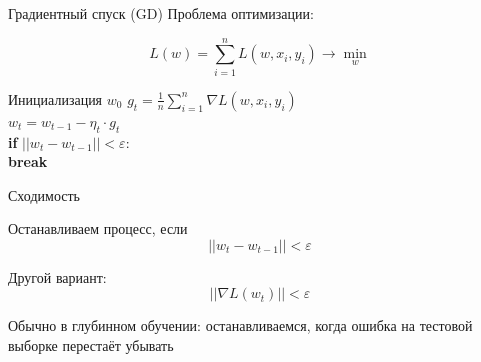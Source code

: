 \documentclass[notes,12pt, aspectratio=169]{beamer}
\newcommand{\pgr}[1]{{\color{green} \textbf{#1}}}
\newenvironment{wideitemize}{\itemize\addtolength{\itemsep}{10pt}}{\enditemize}
\begin{document}
\begin{frame}[fragile]{Градиентный спуск (GD)}
Проблема оптимизации: 

\[   
L(w) = \sum_{i=1}^n L(w, x_i, y_i) \to \min_{w}
\]

Инициализация $w_0$ 
\hspace{15pt} $g_t = \frac{1}{n}\sum_{i=1}^n  \nabla L(w, x_i, y_i)$ \\
\pgr{\hspace{15pt}} $w_t = w _{t-1} - \eta_t \cdot g_t $ \\
\pgr{\hspace{15pt} if} $||w_t - w_{t-1}|| < \varepsilon:$ \\
\pgr{\hspace{30pt} break}
\end{frame}


\begin{frame}[fragile]{Сходимость}

\begin{wideitemize}
\item Останавливаем процесс, если  $$ || w_t - w_{t-1}|| < \varepsilon $$

\item  Другой вариант: $$ || \nabla L(w_t) || < \varepsilon $$

\item Обычно в глубинном обучении: останавливаемся, когда ошибка на тестовой выборке перестаёт убывать 
\end{wideitemize}
\end{frame}
\end{document}
